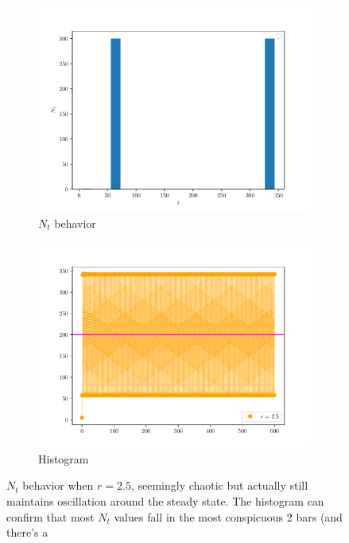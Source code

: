 \begin{homeworkProblem}[4]
\begin{enumerate}
\begin{figure}[htbp]
    \begin{subfigure}[t]{0.4\linewidth}
        \centering
        \includegraphics[scale=0.5]{fig/fig4(d)(5).pdf}
        \caption{$N_t$ behavior}
    \end{subfigure}
    \hfill
    \begin{subfigure}[t]{0.4\linewidth}
        \centering
        \includegraphics[scale=0.5]{fig/fig4(d)(5)_chaos2.5.pdf}
        \caption{Histogram}
    \end{subfigure}
    \caption{$N_t$ behavior when $r = 2.5$, seemingly chaotic but actually still
    maintains oscillation around the steady state. The histogram can confirm
    that most $N_t$ values fall in the most conspicuous 2 bars (and there's a
}
\end{figure}
\end{enumerate}
\end{homeworkProblem}
